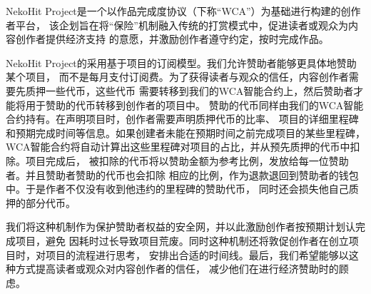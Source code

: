 NekoHit Project是一个以作品完成度协议（下称“WCA”）为基础进行构建的创作者平台，
该企划旨在将“保险”机制融入传统的打赏模式中，促进读者或观众为内容创作者提供经济支持
的意愿，并激励创作者遵守约定，按时完成作品。

NekoHit Project的采用基于项目的订阅模型。我们允许赞助者能够更具体地赞助某个项目，
而不是每月支付订阅费。为了获得读者与观众的信任，内容创作者需要先质押一些代币，这些代币
需要转移到我们的WCA智能合约上，然后赞助者才能将用于赞助的代币转移到创作者的项目中。
赞助的代币同样由我们的WCA智能合约持有。在声明项目时，创作者需要声明质押代币的比率、
项目的详细里程碑和预期完成时间等信息。如果创建者未能在预期时间之前完成项目的某些里程碑，
WCA智能合约将自动计算出这些里程碑对项目的占比，并从预先质押的代币中扣除。项目完成后，
被扣除的代币将以赞助金额为参考比例，发放给每一位赞助者。并且赞助者赞助的代币也会扣除
相应的比例，作为退款退回到赞助者的钱包中。于是作者不仅没有收到他违约的里程碑的赞助代币，
同时还会损失他自己质押的部分代币。

我们将这种机制作为保护赞助者权益的安全网，并以此激励创作者按预期计划认完成项目，避免
因耗时过长导致项目荒废。同时这种机制还将敦促创作者在创立项目时，对项目的流程进行思考，
安排出合适的时间线。最后，我们希望能够以这种方式提高读者或观众对内容创作者的信任，
减少他们在进行经济赞助时的顾虑。
